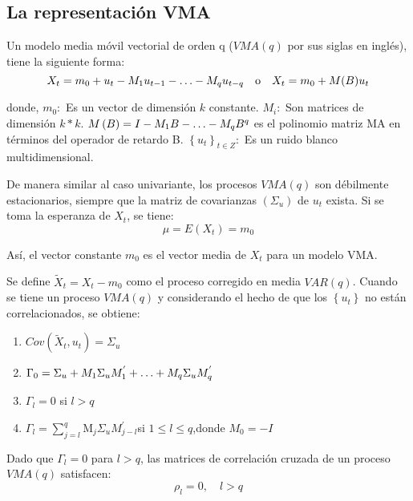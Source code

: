\subsection{La representaci\'{o}n VMA}
\label{subsubsec:mylabel6}

Un modelo media m\'{o}vil vectorial de orden q ($VMA\left( q \right)$ por sus siglas en ingl\'{e}s), tiene la siguiente forma:
\[
X_{t}=m_{0}+u_{t}-M_{1}u_{t-1}-\mathellipsis -M_{q}u_{t-q}\quad \text{o}\quad X_{t}=m_{0}+M(B)u_{t}
\]

donde,\newline 
$m_{0}:$ Es un vector de dimensi\'{o}n $k$ constante$.$\newline
$M_{i}:$ Son matrices de dimensi\'{o}n $k\ast k$.\newline
$M\left( B \right)=I-M_{1}B-\mathellipsis -M_{q}B^{q}$ es el polinomio matriz MA en t\'{e}rminos del operador de retardo B.\newline
$\left\{ u_{t} \right\}_{t\in Z}:$ Es un ruido blanco multidimensional.\newline

De manera similar al caso univariante, los procesos $VMA\left( q \right)$ son d\'{e}bilmente estacionarios, siempre que la matriz de covarianzas $\left(\Sigma_{u} \right)$ de $u_{t}$ exista. Si se toma la esperanza de $X_{t}$, se tiene:
\[
\mu =E\left( X_{t} \right)=m_{0}
\]

As\'{i}, el vector constante $m_{0}$ es el vector media de $X_{t}$ para un modelo VMA.

Se define $\tilde{X}_{t}=X_{t}-m_{0}$ como el proceso corregido en media $VAR(q)$. Cuando se tiene un proceso $VMA(q)$ y considerando el hecho de que los $\left\{ u_{t} \right\}$ no est\'{a}n correlacionados, se obtiene:

\begin{enumerate}
      \item $Cov\left( \tilde{X}_{t},u_{t} \right)=\Sigma_{u}$
      \item $\Gamma_{0}=\Sigma_{u}+M_{1}\Sigma_{u}M_{1}^{'}+\mathellipsis +M_{q}\Sigma_{u}M_{q}^{'}$
      \item $\Gamma_{l}=0$ si $l>q$
      \item $\Gamma_{l}=\sum_{j=l}^q {\mathrm{M}_{j}\Sigma_{u}M_{j-l}^{'}}$\quad si $1\le l \leq q$,\quad donde $M_{0}=-I$
\end{enumerate}

Dado que $\Gamma_{l}=0$ para $l>q$, las matrices de correlaci\'{o}n cruzada de un proceso $VMA(q)$ satisfacen:
\[
\rho_{l}=0,\quad l>q
\]

